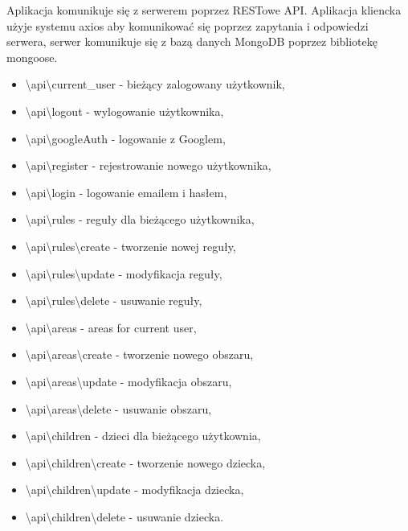 \documentclass{sprawozdanie-agh}
\begin{document}
			Aplikacja komunikuje się z serwerem poprzez RESTowe API. Aplikacja kliencka użyje systemu axios aby komunikować się poprzez zapytania i odpowiedzi serwera, serwer komunikuje się z bazą danych MongoDB poprzez bibliotekę mongoose.
			
			\begin{itemize}
				\item \textbackslash api\textbackslash current\_user - bieżący zalogowany użytkownik,
				\item \textbackslash api\textbackslash logout - wylogowanie użytkownika,
				\item \textbackslash api\textbackslash googleAuth - logowanie z Googlem,
				\item \textbackslash api\textbackslash register - rejestrowanie nowego użytkownika,
				\item \textbackslash api\textbackslash login - logowanie emailem i hasłem,
				\item \textbackslash api\textbackslash rules - reguły dla bieżącego użytkownika,
				\item \textbackslash api\textbackslash rules\textbackslash create - tworzenie nowej reguły,
				\item \textbackslash api\textbackslash rules\textbackslash update - modyfikacja reguły,
				\item \textbackslash api\textbackslash rules\textbackslash delete - usuwanie reguły,
				\item \textbackslash api\textbackslash areas - areas for current user,
				\item \textbackslash api\textbackslash areas\textbackslash create - tworzenie nowego obszaru,
				\item \textbackslash api\textbackslash areas\textbackslash update - modyfikacja obszaru,
				\item \textbackslash api\textbackslash areas\textbackslash delete - usuwanie obszaru,	
				\item \textbackslash api\textbackslash children - dzieci dla bieżącego użytkownia,
				\item \textbackslash api\textbackslash children\textbackslash create - tworzenie nowego dziecka,
				\item \textbackslash api\textbackslash children\textbackslash update - modyfikacja dziecka,
				\item \textbackslash api\textbackslash children\textbackslash delete - usuwanie dziecka.
			\end{itemize}
		
\end{document}
